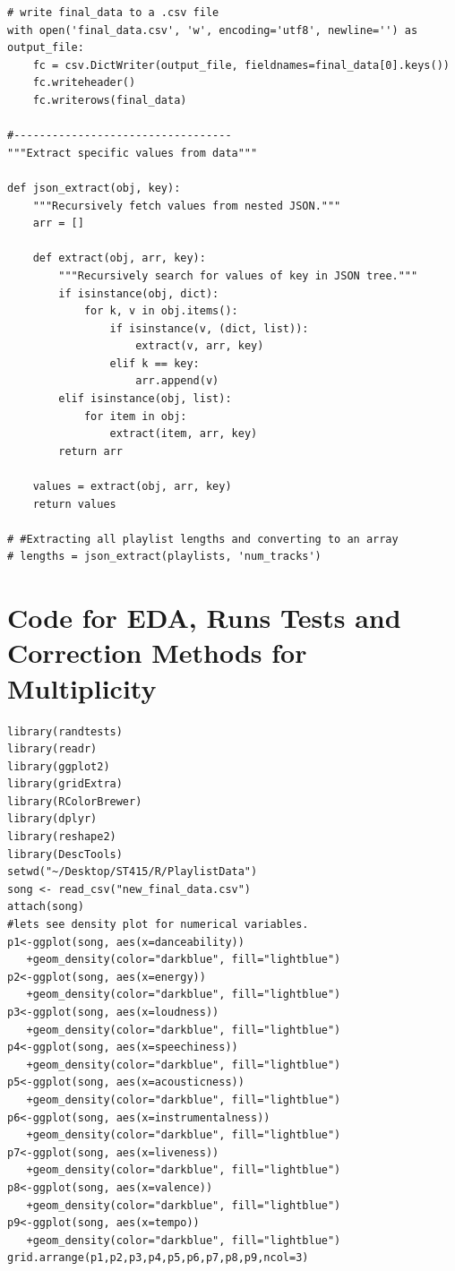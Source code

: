 \documentclass[12pt]{article}
\theoremstyle{plain}
\theoremstyle{definition}
\theoremstyle{remark}
\begin{document}
\begin{appendices}
\begin{verbatim}
# write final_data to a .csv file
with open('final_data.csv', 'w', encoding='utf8', newline='') as output_file:
    fc = csv.DictWriter(output_file, fieldnames=final_data[0].keys())
    fc.writeheader()
    fc.writerows(final_data)

#----------------------------------
"""Extract specific values from data"""

def json_extract(obj, key):
    """Recursively fetch values from nested JSON."""
    arr = []

    def extract(obj, arr, key):
        """Recursively search for values of key in JSON tree."""
        if isinstance(obj, dict):
            for k, v in obj.items():
                if isinstance(v, (dict, list)):
                    extract(v, arr, key)
                elif k == key:
                    arr.append(v)
        elif isinstance(obj, list):
            for item in obj:
                extract(item, arr, key)
        return arr

    values = extract(obj, arr, key)
    return values

# #Extracting all playlist lengths and converting to an array
# lengths = json_extract(playlists, 'num_tracks')
\end{verbatim}
\section{Code for EDA, Runs Tests and Correction Methods for Multiplicity}
\begin{verbatim}
library(randtests)
library(readr)
library(ggplot2)
library(gridExtra)
library(RColorBrewer)
library(dplyr)
library(reshape2)
library(DescTools)
setwd("~/Desktop/ST415/R/PlaylistData")
song <- read_csv("new_final_data.csv")
attach(song)
#lets see density plot for numerical variables.
p1<-ggplot(song, aes(x=danceability))
   +geom_density(color="darkblue", fill="lightblue")
p2<-ggplot(song, aes(x=energy))
   +geom_density(color="darkblue", fill="lightblue")
p3<-ggplot(song, aes(x=loudness))
   +geom_density(color="darkblue", fill="lightblue")
p4<-ggplot(song, aes(x=speechiness))
   +geom_density(color="darkblue", fill="lightblue")
p5<-ggplot(song, aes(x=acousticness))
   +geom_density(color="darkblue", fill="lightblue")
p6<-ggplot(song, aes(x=instrumentalness))
   +geom_density(color="darkblue", fill="lightblue")
p7<-ggplot(song, aes(x=liveness))
   +geom_density(color="darkblue", fill="lightblue")
p8<-ggplot(song, aes(x=valence))
   +geom_density(color="darkblue", fill="lightblue")
p9<-ggplot(song, aes(x=tempo))
   +geom_density(color="darkblue", fill="lightblue")
grid.arrange(p1,p2,p3,p4,p5,p6,p7,p8,p9,ncol=3)


\end{verbatim}
\end{appendices}
\end{document}
